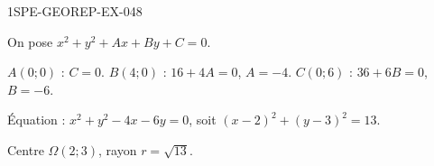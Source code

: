 \begin{corrige}{1SPE-GEOREP-EX-048}

On pose $x^2 + y^2 + Ax + By + C = 0$.

$A(0;0)$ : $C = 0$. $B(4;0)$ : $16 + 4A = 0$, $A = -4$. $C(0;6)$ : $36 + 6B = 0$, $B = -6$.

Équation : $x^2 + y^2 - 4x - 6y = 0$, soit $(x-2)^2 + (y-3)^2 = 13$.

Centre $\Omega(2 ; 3)$, rayon $r = \sqrt{13}$.

\end{corrige}
